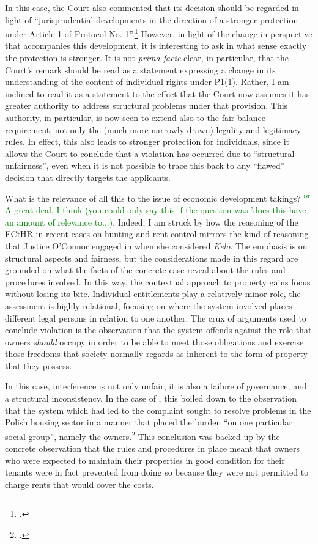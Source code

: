 \documentclass[12pt,a4paper]{book} %
\newcommand{\isr}[1]{\textcolor{green}{$^{\textrm{isr}}${#1}}}
\begin{document}
In this case, the Court also commented that its decision should be regarded in light of ``jurisprudential developments in the direction of a stronger protection under Article 1 of Protocol No. 1''.\footcite[135]{lindheim12} However, in light of the change in perspective that accompanies this development, it is interesting to ask in what sense exactly the protection is stronger. It is not {\it prima facie} clear, in particular, that the Court's remark should be read as a statement expressing a change in its understanding of the content of individual rights under P1(1). Rather, I am inclined to read it as a statement to the effect that the Court now assumes it has greater authority to address structural problems under that provision. This authority, in particular, is now seen to extend also to the fair balance requirement, not only the (much more narrowly drawn) legality and legitimacy rules. In effect, this also leads to stronger protection for individuals, since it allows the Court to conclude that a violation has occurred due to ``structural unfairness'', even when it is not possible to trace this back to any ``flawed'' decision that directly targets the applicants.

What is the relevance of all this to the issue of economic development takings? \isr{A great deal, I think (you could only say this if the question was 'does this have an amount of relevance to...)}. Indeed, I am struck by how the reasoning of the ECtHR in recent cases on hunting and rent control mirrors the kind of reasoning that Justice O'Connor engaged in when she considered {\it Kelo}. The emphasis is on structural aspects and fairness, but the considerations made in this regard are grounded on what the facts of the concrete case reveal about the rules and procedures involved. In this way, the contextual approach to property gains focus without losing its bite. Individual entitlements play a relatively minor role, the assessment is highly relational, focusing on where the system involved places different legal persons in relation to one another. The crux of arguments used to conclude violation is the observation that the system offends against the role that owners {\it should} occupy in order to be able to meet those obligations and exercise those freedoms that society normally regards as inherent to the form of property that they possess.

In this case, interference is not only unfair, it is also a failure of governance, and a structural inconsistency. In the case of \textcite{hutten06}, this boiled down to the observation that the system which had led to the complaint sought to resolve problems in the Polish housing sector in a manner that placed the burden ``on one particular social group'', namely the owners.\footcite[225]{hutten06} This conclusion was backed up by the concrete observation that the rules and procedures in place meant that owners who were expected to maintain their properties in good condition for their tenants were in fact prevented from doing so because they were not permitted to charge rents that would cover the costs.
\end{document}
